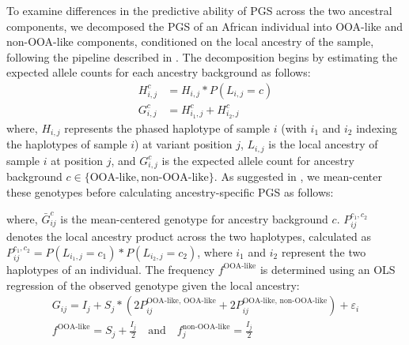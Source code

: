 To examine differences in the predictive ability of PGS across the two ancestral components, we decomposed the PGS of an African individual into OOA-like and non-OOA-like components, conditioned on the local ancestry of the sample, following the pipeline described in \cite{hu2023leveraging}. The decomposition begins by estimating the expected allele counts for each ancestry background as follows:
\begin{align}
    H^{c}_{i,j} &= H_{i,j} * P(L_{i,j} = c) \nonumber \\
    G^{c}_{i,j} &= H^{c}_{i_1,j} + H^{c}_{i_2,j}
\end{align}
where, $H_{i,j}$ represents the phased haplotype of sample $i$ (with $i_1$ and $i_2$ indexing the haplotypes of sample $i$) at variant position $j$, $L_{i,j}$ is the local ancestry of sample $i$ at position $j$, and $G^{c}_{i,j}$ is the expected allele count for ancestry background $c \in \{\text{OOA-like}, \text{non-OOA-like}\}$. As suggested in \cite{hu2023leveraging}, we mean-center these genotypes before calculating ancestry-specific PGS as follows:
\begin{center}
\end{center}
where, $\bar{G}_{ij}^{c}$ is the mean-centered genotype for ancestry background $c$. $P_{ij}^{c_1, c_2}$ denotes the local ancestry product across the two haplotypes, calculated as $P_{ij}^{c_1, c_2} = P(L_{i_1,j} = c_1) * P(L_{i_2,j} = c_2)$, where $i_1$ and $i_2$ represent the two haplotypes of an individual. The frequency $f^{\text{OOA-like}}$ is determined using an OLS regression of the observed genotype given the local ancestry:
\begin{align}
    G_{ij} = I_j + S_j \ast \left( 2P_{ij}^{\text{OOA-like, OOA-like}} + 2P_{ij}^{\text{OOA-like, non-OOA-like}} \right) + \varepsilon_i \nonumber \\
    f^{\text{OOA-like}} = S_j + \frac{I_j}{2} \quad \text{and} \quad f_j^{\text{non-OOA-like}} = \frac{I_j}{2}
\end{align}

